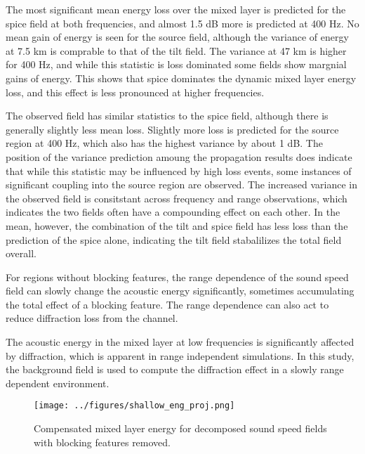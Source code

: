 \documentclass[preprint,NumberedRefs]{JASA}
\begin{document}
The most significant mean energy loss over the mixed layer is predicted for the spice field at both frequencies, and almost 1.5 dB more is predicted at 400 Hz. No mean gain of energy is seen for the source field, although the variance of energy at 7.5 km is comprable to that of the tilt field. The variance at 47 km is higher for 400 Hz, and while this statistic is loss dominated some fields show margnial gains of energy. This shows that spice dominates the dynamic mixed layer energy loss, and this effect is less pronounced at higher frequencies.

The observed field has similar statistics to the spice field, although there is generally slightly less mean loss. Slightly more loss is predicted for the source region at 400 Hz, which also has the highest variance by about 1 dB. The position of the variance prediction amoung the propagation results does indicate that while this statistic may be influenced by high loss events, some instances of significant coupling into the source region are observed. The increased variance in the observed field is consitstant across frequency and range observations, which indicates the two fields often have a compounding effect on each other. In the mean, however, the combination of the tilt and spice field has less loss than the prediction of the spice alone, indicating the tilt field stabalilizes the total field overall.

For regions without blocking features, the range dependence of the sound speed field can slowly change the acoustic energy significantly, sometimes accumulating the total effect of a blocking feature. The range dependence can also act to reduce diffraction loss from the channel.

The acoustic energy in the mixed layer at low frequencies is significantly affected by diffraction, which is apparent in range independent simulations. In this study, the background field is used to compute the diffraction effect in a slowly range dependent environment.

\begin{figure}
\texttt{[image: ../figures/shallow\_eng\_proj.png]}
    \caption{Compensated mixed layer energy for decomposed sound speed fields with blocking features removed.}
    \label{fig:shal_no_block}
\end{figure}




\end{document}
